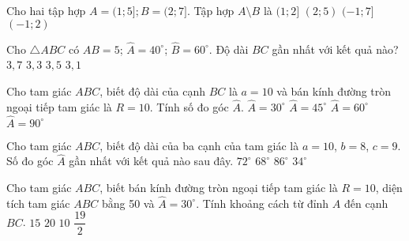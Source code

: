 \begin{ex}%
	Cho hai tập hợp $A=(1;5];B=(2;7]$. Tập hợp $A \setminus B$ là
	\choice
	{\True $(1;2]$}
	{$(2;5)$}
	{$(-1;7]$}
	{$(-1;2)$}
	\loigiai{
		Ta có 	$A \setminus B=\left\{ x \in \mathbb{R} \setminus x \in A \text{ và } x \notin B \right\} \Rightarrow x \in (1;2]$. .
	}
\end{ex}
\begin{ex}%
	Cho $\triangle ABC$ có $AB=5$; $\widehat{A}=40^{\circ}$; $\widehat{B}=60^{\circ}$. Độ dài $BC$ gần nhất với kết quả nào?
	\choice
	{$3,7$}
	{\True $3,3$}
	{$3,5$}
	{$3,1$}
\end{ex}
\begin{ex}%
	Cho tam giác $ABC$, biết độ dài của cạnh $BC$ là $a=10$ và bán kính đường tròn ngoại tiếp tam giác là $R=10$. Tính số đo góc $\widehat{A}$.
	\choice
	{\True $\widehat{A}=30^{\circ}$}
	{$\widehat{A}=45^{\circ}$}
	{$\widehat{A}=60^{\circ}$}
	{$\widehat{A}=90^{\circ}$}
\end{ex}
\begin{ex}%
	Cho tam giác $ABC$, biết độ dài của ba cạnh của tam giác là $a=10$, $b=8$, $c=9$. Số đo góc $\widehat{A}$ gần nhất với kết quả nào sau đây.
	\choice
	{\True $72^{\circ}$}
	{$68^{\circ}$}
	{$86^{\circ}$}
	{$34^{\circ}$}
\end{ex}
\begin{ex}%
	Cho tam giác $ABC$, biết bán kính đường tròn ngoại tiếp tam giác là $R=10$, diện tích tam giác $ABC$ bằng 50 và $\widehat{A}=30^{\circ}$. Tính khoảng cách từ đỉnh $A$ đến cạnh $BC$.
	\choice
	{$15$}
	{$20$}
	{\True $10$}
	{$\dfrac{19}{2}$}
\end{ex}

